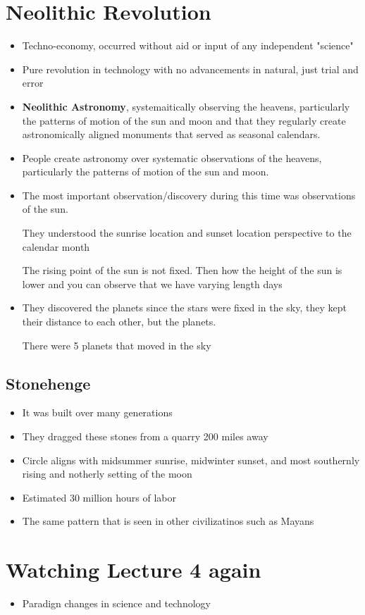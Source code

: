 \documentclass{article}
\begin{document}
\section*{Neolithic Revolution}
\begin{itemize}
  \item Techno-economy,
    occurred without aid or input of any independent "science"
  \item Pure revolution in technology with no advancements
    in natural, just trial and error
  \item \textbf{Neolithic Astronomy}, systemaitically observing the heavens,
    particularly the patterns of motion of the sun and moon and
    that they regularly create astronomically aligned monuments
    that served as seasonal calendars.
  \item People create astronomy over systematic observations
    of the heavens, particularly the patterns of motion of the sun and moon.
  \item The most important observation/discovery during this time was
    observations of the sun.

    They understood the sunrise location and sunset location perspective
    to the calendar month

    The rising point of the sun is not fixed. Then how the height of the sun is lower
    and you can observe that we have varying length days
  \item They discovered the planets since the stars were fixed in the sky,
    they kept their distance to each other, but the planets.

    There were 5 planets that moved in the sky
\end{itemize}

\subsection{Stonehenge}
\begin{itemize}
  \item It was built over many generations
  \item They dragged these stones from a quarry
    200 miles away
  \item Circle aligns with midsummer sunrise, midwinter sunset, and most southernly
    rising and notherly setting of the moon
  \item Estimated 30 million hours of labor
  \item The same pattern that is seen in other
    civilizatinos such as Mayans
\end{itemize}

\section*{Watching Lecture 4 again}
\begin{itemize}
  \item Paradign changes in science and technology
\end{itemize}
\end{document}
